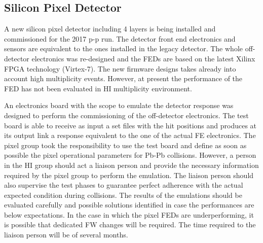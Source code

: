 \subsection{Silicon Pixel Detector\label{subsec:SiPixel}}
A new silicon pixel detector including 4 layers is being installed and commissioned for the 2017 p-p run. The detector front end electronics and sensors are equivalent to the ones installed in the legacy detector. The whole off-detector electronics was re-designed and the FEDs are based on the latest Xilinx FPGA technology (Virtex-7). The new firmware designs takes already into account high multiplicity events. However, at present the performance of the FED has not been evaluated in HI multiplicity environment. 

An electronics board with the scope to emulate the detector response was designed to perform the commissioning of the off-detector electronics. The test board is able to receive as input a set files with the hit positions and produces at its output link a response equivalent to the one of the actual FE electronics. The pixel group took the responsibility to use the test board and define as soon as possible the pixel operational parameters for Pb-Pb collisions. However, a person in the HI group should act a liaison person and provide the necessary information required by the pixel group to perform the emulation. The liaison person should also supervise the test phases to guarantee perfect adherence with the actual expected condition during collisions. The results of the emulations should be evaluated carefully and possible solutions identified in case the performances are below expectations. In the case in which the pixel FEDs are underperforming, it is possible that dedicated FW changes will be required. The time required to the liaison person will be of several months. 

